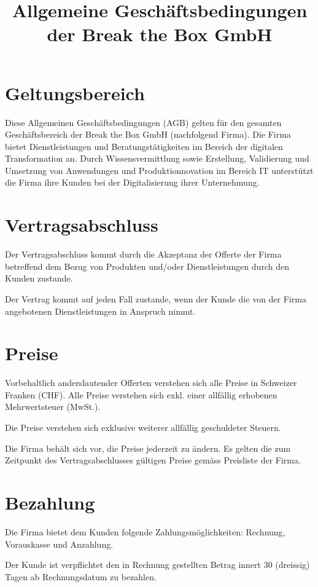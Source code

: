 \documentclass[twocolumn, 10pt]{article}
\title{Allgemeine Geschäftsbedingungen der Break the Box GmbH}
\begin{document}
\maketitle

\section{Geltungsbereich}
Diese Allgemeinen Geschäftsbedingungen (\guillemotleft AGB\guillemotright) gelten für den gesamten Geschäftsbereich der Break the Box GmbH (nachfolgend \guillemotleft Firma\guillemotright). Die Firma bietet Dienstleistungen und Beratungstätigkeiten im Bereich der digitalen Transformation an. Durch Wissensvermittlung sowie Erstellung, Validierung und Umsetzung von Anwendungen und Produktionnovation im Bereich IT unterstützt die Firma ihre Kunden bei der Digitalisierung ihrer Unternehmung.

\section{Vertragsabschluss}
Der Vertragsabschluss kommt durch die Akzeptanz der Offerte der Firma betreffend dem Bezug von Produkten und/oder Dienstleistungen durch den Kunden zustande.

Der Vertrag kommt auf jeden Fall zustande, wenn der Kunde die von der Firma angebotenen Dienstleistungen in Anspruch nimmt.

\section{Preise}
Vorbehaltlich anderslautender Offerten verstehen sich alle Preise in Schweizer Franken (CHF). Alle Preise verstehen sich exkl. einer allfällig erhobenen Mehrwertsteuer (MwSt.).

Die Preise verstehen sich exklusive weiterer allfällig geschuldeter Steuern.

Die Firma behält sich vor, die Preise jederzeit zu ändern. Es gelten die zum Zeitpunkt des Vertragsabschlusses gültigen Preise gemäss Preisliste der Firma.

\section{Bezahlung}
Die Firma bietet dem Kunden folgende Zahlungsmöglichkeiten: Rechnung, Vorauskasse und Anzahlung.

Der Kunde ist verpflichtet den in Rechnung gestellten Betrag innert 30 (dreissig) Tagen ab Rechnungsdatum zu bezahlen.
\end{document}
